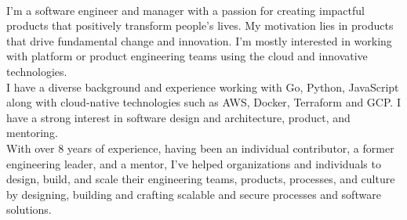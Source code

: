 \documentclass[9pt]{developercv} %
\begin{document}

\begin{minipage}[t]{1\textwidth} %
    {  \\
        I'm a software engineer and manager with a passion for creating impactful products 
        that positively transform people's lives. My motivation lies in products that drive fundamental 
        change and innovation. I'm mostly interested in working with platform or product engineering 
        teams using the cloud and innovative technologies. \\

        I have a diverse background and experience working with Go, Python, JavaScript along with 
        cloud-native technologies such as AWS, Docker, Terraform and GCP. I have a strong interest 
        in software design and architecture, product, and mentoring. \\ 
    
        With over 8 years of experience, having been an individual contributor, a former engineering 
        leader, and a mentor, I've helped organizations and individuals to design, build, and scale 
        their engineering teams, products, processes, and culture by designing, building and crafting 
        scalable and secure processes and software solutions. 
    }
\end{minipage}



\end{document}
